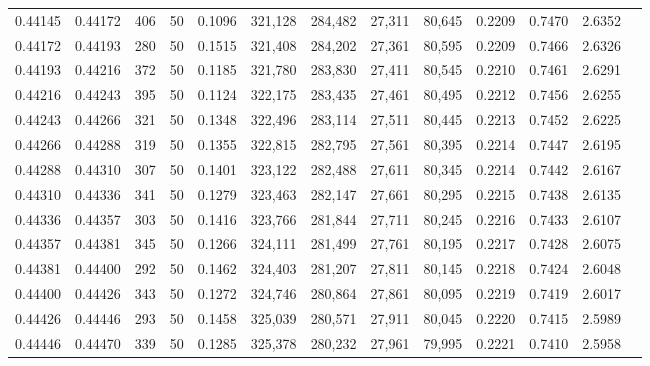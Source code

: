 \begin{tabular}{rrrrrrrrrrrrr}
0.44145 & 0.44172 &   406 &  50 &                                     0.1096 & 321,128 & 284,482 &  27,311 &  80,645 & 0.2209 & 0.7470 & 2.6352 \\
0.44172 & 0.44193 &   280 &  50 &                                     0.1515 & 321,408 & 284,202 &  27,361 &  80,595 & 0.2209 & 0.7466 & 2.6326 \\
0.44193 & 0.44216 &   372 &  50 &                                     0.1185 & 321,780 & 283,830 &  27,411 &  80,545 & 0.2210 & 0.7461 & 2.6291 \\
0.44216 & 0.44243 &   395 &  50 &                                     0.1124 & 322,175 & 283,435 &  27,461 &  80,495 & 0.2212 & 0.7456 & 2.6255 \\
0.44243 & 0.44266 &   321 &  50 &                                     0.1348 & 322,496 & 283,114 &  27,511 &  80,445 & 0.2213 & 0.7452 & 2.6225 \\
0.44266 & 0.44288 &   319 &  50 &                                     0.1355 & 322,815 & 282,795 &  27,561 &  80,395 & 0.2214 & 0.7447 & 2.6195 \\
0.44288 & 0.44310 &   307 &  50 &                                     0.1401 & 323,122 & 282,488 &  27,611 &  80,345 & 0.2214 & 0.7442 & 2.6167 \\
0.44310 & 0.44336 &   341 &  50 &                                     0.1279 & 323,463 & 282,147 &  27,661 &  80,295 & 0.2215 & 0.7438 & 2.6135 \\
0.44336 & 0.44357 &   303 &  50 &                                     0.1416 & 323,766 & 281,844 &  27,711 &  80,245 & 0.2216 & 0.7433 & 2.6107 \\
0.44357 & 0.44381 &   345 &  50 &                                     0.1266 & 324,111 & 281,499 &  27,761 &  80,195 & 0.2217 & 0.7428 & 2.6075 \\
0.44381 & 0.44400 &   292 &  50 &                                     0.1462 & 324,403 & 281,207 &  27,811 &  80,145 & 0.2218 & 0.7424 & 2.6048 \\
0.44400 & 0.44426 &   343 &  50 &                                     0.1272 & 324,746 & 280,864 &  27,861 &  80,095 & 0.2219 & 0.7419 & 2.6017 \\
0.44426 & 0.44446 &   293 &  50 &                                     0.1458 & 325,039 & 280,571 &  27,911 &  80,045 & 0.2220 & 0.7415 & 2.5989 \\
0.44446 & 0.44470 &   339 &  50 &                                     0.1285 & 325,378 & 280,232 &  27,961 &  79,995 & 0.2221 & 0.7410 & 2.5958 \\

\end{tabular}
